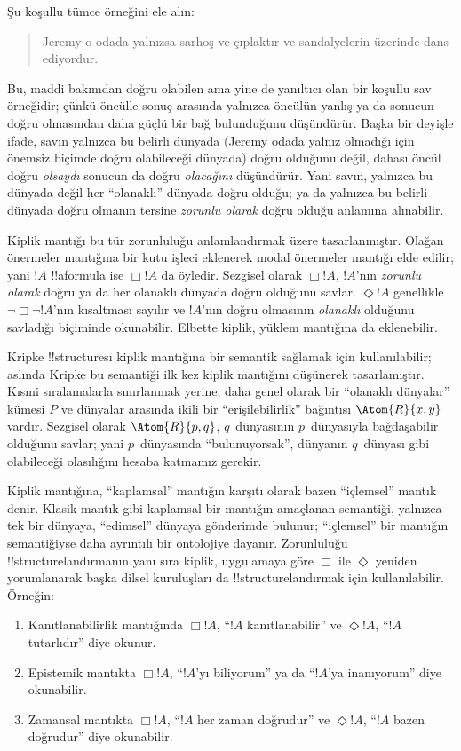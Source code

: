 \documentclass[../../../include/open-logic-section]{subfiles}
\begin{document}


Şu koşullu tümce örneğini ele alın:
\begin{quote}
  Jeremy o odada yalnızsa sarhoş ve çıplaktır ve sandalyelerin üzerinde dans
  ediyordur.
\end{quote}
Bu, maddi bakımdan doğru olabilen ama yine de yanıltıcı olan bir koşullu sav
örneğidir; çünkü öncülle sonuç arasında yalnızca öncülün yanlış ya da sonucun
doğru olmasından daha güçlü bir bağ bulunduğunu düşündürür. Başka bir deyişle
ifade, savın yalnızca bu belirli dünyada (Jeremy odada yalnız olmadığı için
önemsiz biçimde doğru olabileceği dünyada) doğru olduğunu değil, dahası öncül
doğru \emph{olsaydı} sonucun da doğru \emph{olacağını} düşündürür. Yani savın,
yalnızca bu dünyada değil her ``olanaklı'' dünyada doğru olduğu; ya da yalnızca
bu belirli dünyada doğru olmanın tersine \emph{zorunlu olarak} doğru olduğu
anlamına alınabilir.

Kiplik mantığı bu tür zorunluluğu anlamlandırmak üzere tasarlanmıştır. Olağan
önermeler mantığına bir kutu işleci eklenerek modal önermeler mantığı elde
edilir; yani $!A$ !!a{formula} ise $\Box !A$ da öyledir. Sezgisel olarak
$\Box !A$, $!A$'nın \emph{zorunlu olarak} doğru ya da her olanaklı dünyada
doğru olduğunu savlar. $\Diamond !A$ genellikle $\lnot \Box \lnot !A$'nın
kısaltması sayılır ve $!A$'nın doğru olmasının \emph{olanaklı} olduğunu
savladığı biçiminde okunabilir. Elbette kiplik, yüklem mantığına da eklenebilir.

Kripke !!{structure}{}sı kiplik mantığına bir semantik sağlamak için
kullanılabilir; aslında Kripke bu semantiği ilk kez kiplik mantığını düşünerek
tasarlamıştır. Kısmi sıralamalarla sınırlanmak yerine, daha genel olarak bir
``olanaklı dünyalar'' kümesi $P$ ve dünyalar arasında ikili bir
``erişilebilirlik'' bağıntısı $\Atom{R}{x,y}$ vardır. Sezgisel olarak
$\Atom{R}{p,q}$, $q$~dünyasının $p$~dünyasıyla bağdaşabilir olduğunu savlar;
yani $p$~dünyasında ``bulunuyorsak'', dünyanın $q$~dünyası gibi olabileceği
olasılığını hesaba katmamız gerekir.

Kiplik mantığına, ``kaplamsal'' mantığın karşıtı olarak bazen ``içlemsel''
mantık denir. Klasik mantık gibi kaplamsal bir mantığın amaçlanan semantiği,
yalnızca tek bir dünyaya, ``edimsel'' dünyaya gönderimde bulunur; ``içlemsel''
bir mantığın semantiğiyse daha ayrıntılı bir ontolojiye dayanır. Zorunluluğu
!!{structure}{}landırmanın yanı sıra kiplik, uygulamaya göre $\Box$ ile $\Diamond$
yeniden yorumlanarak başka dilsel kuruluşları da !!{structure}{}landırmak için
kullanılabilir. Örneğin:
\begin{enumerate}
\item Kanıtlanabilirlik mantığında $\Box !A$, ``$!A$ kanıtlanabilir'' ve
  $\Diamond !A$, ``$!A$ tutarlıdır'' diye okunur.
\item Epistemik mantıkta $\Box !A$, ``$!A$'yı biliyorum'' ya da ``$!A$'ya
  inanıyorum'' diye okunabilir.
\item Zamansal mantıkta $\Box !A$, ``$!A$ her zaman doğrudur'' ve
  $\Diamond !A$, ``$!A$ bazen doğrudur'' diye okunabilir.
\end{enumerate}
\end{document}
